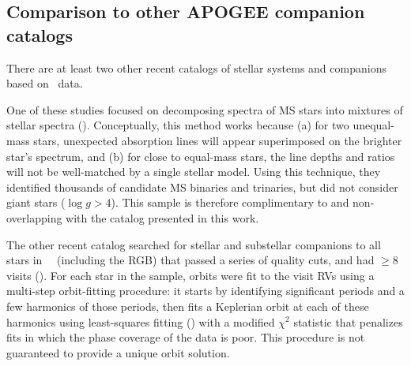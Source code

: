 \documentclass[modern, letterpaper]{aastex62}
\newcommand{\apogee}{\project{\acronym{APOGEE}}}
\newcommand{\DRtw}{\acronym{DR12}}
\begin{document}
\subsection{Comparison to other APOGEE companion catalogs}
\label{sec:compare-troup}

There are at least two other recent catalogs of stellar systems and companions
based on \apogee\ data.

One of these studies focused on decomposing spectra of MS stars into mixtures of
stellar spectra (\citealt{El-Badry:2018}).
Conceptually, this method works because (a) for two unequal-mass stars,
unexpected absorption lines will appear superimposed on the brighter star's
spectrum, and (b) for close to equal-mass stars, the line depths and ratios will
not be well-matched by a single stellar model.
Using this technique, they identified thousands of candidate MS binaries and
trinaries, but did not consider giant stars ($\log g > 4$).
This sample is therefore complimentary to and non-overlapping with the catalog
presented in this work.

The other recent catalog searched for stellar and substellar companions to all
stars in \apogee\ \DRtw\ (including the RGB) that passed a series of quality
cuts, and had $\geq 8$ visits (\citealt{Troup:2016}).
For each star in the sample, orbits were fit to the visit RVs using a multi-step
orbit-fitting procedure: it starts by identifying significant periods and a few
harmonics of those periods, then fits a Keplerian orbit at each of these
harmonics using least-squares fitting (\citealt{De-Lee:2013}) with a modified
$\chi^2$ statistic that penalizes fits in which the phase coverage of the data
is poor.
This procedure is not guaranteed to provide a unique orbit solution.
\end{document}
